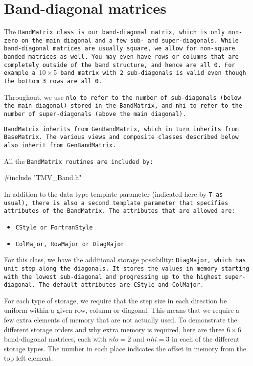 
\section{Band-diagonal matrices}
\label{BandMatrix}

The \tt{BandMatrix} class is our band-diagonal matrix, which is only non-zero
on the main diagonal and a few sub- and super-diagonals.  While band-diagonal
matrices are usually square, we allow for non-square banded matrices as well.
You may even have rows or columns that are completely outside of the 
band structure, and hence are all 0.  For example a $10\times 5$ band matrix
with 2 sub-diagonals is valid even though the bottom 3 rows are all 0.

Throughout, we use \tt{nlo} to refer to the number of sub-diagonals 
(below the main diagonal) stored
in the \tt{BandMatrix}, and \tt{nhi} to refer to the number of super-diagonals
(above the main diagonal).

\tt{BandMatrix} inherits from \tt{GenBandMatrix}, which in turn inherits from
\tt{BaseMatrix}.  
The various views and composite classes described below 
also inherit from \tt{GenBandMatrix}.

All the \tt{BandMatrix} routines are included by:
\begin{tmvcode}
#include "TMV_Band.h"
\end{tmvcode}

In addition to the data type template parameter (indicated here by \tt{T} as usual),
there is also a second template parameter that specifies attributes of the
\tt{BandMatrix}.  The attributes that are allowed are:
\begin{itemize}
\item \tt{CStyle} or \tt{FortranStyle}
\item \tt{ColMajor}, \tt{RowMajor} or \tt{DiagMajor}
\end{itemize}
For this class, we have the additional storage possibility: \tt{DiagMajor},
which has unit step along the diagonals.  It stores the values in memory
starting with the lowest sub-diagonal and progressing up to the highest
super-diagonal.
The default attributes are \tt{CStyle} and \tt{ColMajor}.

For each type of storage, we require that the step size in each direction
be uniform within a given row, column or diagonal. 
This means that we require a few extra elements
of memory that are not actually used.
To demonstrate the different storage orders and why extra memory is required, 
here are three $6 \times 6$ band-diagonal
matrices, each with $nlo = 2$ and $nhi = 3$ in each of the different storage
types.  The number in each place indicates the offset in memory from the 
top left element.

